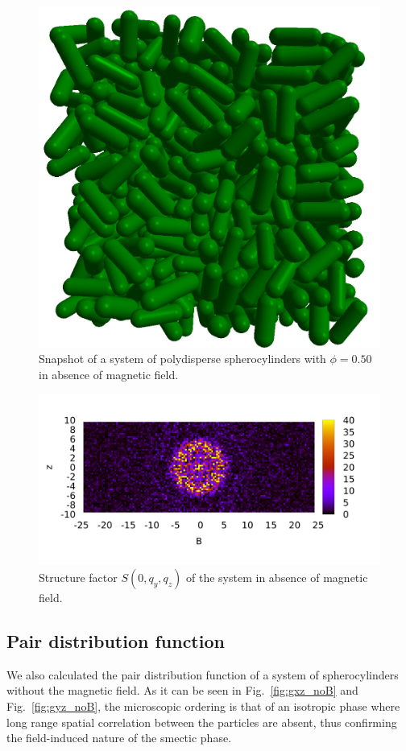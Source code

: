 \documentclass[aip,graphicx]{revtex4-1}
\begin{document}
\begin{figure}
    \centering
    \includegraphics[width=0.5\columnwidth]{Isotropic_phase_snap.png}
    \caption{Snapshot of a system of polydisperse spherocylinders with $\phi = 0.50$ in absence of magnetic field.}
    \label{fig:noB_snapshot}
\end{figure}

\begin{figure}
    \centering
    \includegraphics[width=0.7\columnwidth]{Syz_noB.png}
    \caption{Structure factor $S(0, q_y, q_z)$ of the system in absence of magnetic field.}
    \label{fig:Syz_noB}
\end{figure}

\subsection{Pair distribution function}

We also calculated the pair distribution function of a system of spherocylinders without the magnetic field. As it can be seen in Fig.~\ref{fig:gxz_noB} and Fig.~\ref{fig:gyz_noB}, 
the microscopic ordering is that of an isotropic phase where long range spatial correlation between the particles are absent, thus confirming the field-induced nature of the 
smectic phase.
\end{document}
